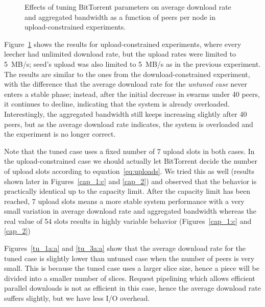 \documentclass[10pt,letterpaper,twocolumn]{article}
\begin{document}
\begin{figure}[!tb] 
  \centering 
  \caption{Effects of tuning BitTorrent parameters on average download
    rate and aggregated bandwidth as a function of peers per node in
    upload-constrained experiments.}
  \label{fig:effect-tuning-upload} 
\end{figure}


Figure~\ref{fig:effect-tuning-upload} shows the results for
upload-constrained experiments, where every leecher had unlimited
download rate, but the upload rates were limited to 5~MB/s; seed's
upload was also limited to 5~MB/s as in the previous experiment. The
results are similar to the ones from the download-constrained
experiment, with the difference that the average download rate for the
\textit{untuned case} never enters a stable phase; instead, after the
initial decrease in swarms under 40 peers, it continues to decline,
indicating that the system is already overloaded. Interestingly, the
aggregated bandwidth still keeps increasing slightly after 40 peers,
but as the average download rate indicates, the system is overloaded
and the experiment is no longer correct.

Note that the tuned case uses a fixed number of 7 upload slots in both
cases. In the upload-constrained case we should actually let
BitTorrent decide the number of upload slots according to
equation~\eqref{eq:uploads}. We tried this as well (results shown
later in Figures~\ref{cap_1:c} and \ref{cap_2}) and observed that the
behavior is practically identical up to the capacity limit. After the
capacity limit has been reached, 7 upload slots means a more stable
system performance with a very small variation in average download
rate and aggregated bandwidth whereas the real value of 54 slots
results in highly variable behavior (Figures~\ref{cap_1:c} and
\ref{cap_2})




Figures~\ref{tu_1a:a} and \ref{tu_3a:a} show that the average download
rate for the tuned case is slightly lower than untuned case when the
number of peers is very small. This is because the tuned case uses a
larger slice size, hence a piece will be divided into a smaller number
of slices. Request pipelining which allows efficient parallel
downloads is not as efficient in this case, hence the average download
rate suffers slightly, but we have less I/O overhead.
\end{document}

